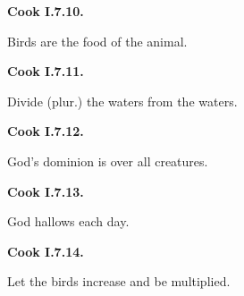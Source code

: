 \par\begin{minipage}{\linewidth}\raggedright
\textbf{Cook I.7.10.}

Birds are the food of the animal.

\end{minipage}\par\addvspace{4pt}

\par\begin{minipage}{\linewidth}\raggedright
\textbf{Cook I.7.11.}

Divide (plur.) the waters from the waters.

\end{minipage}\par\addvspace{4pt}

\par\begin{minipage}{\linewidth}\raggedright
\textbf{Cook I.7.12.}

God's dominion is over all creatures.

\end{minipage}\par\addvspace{4pt}

\par\begin{minipage}{\linewidth}\raggedright
\textbf{Cook I.7.13.}

God hallows each day.

\end{minipage}\par\addvspace{4pt}

\par\begin{minipage}{\linewidth}\raggedright
\textbf{Cook I.7.14.}

Let the birds increase and be multiplied.

\end{minipage}\par\addvspace{4pt}

